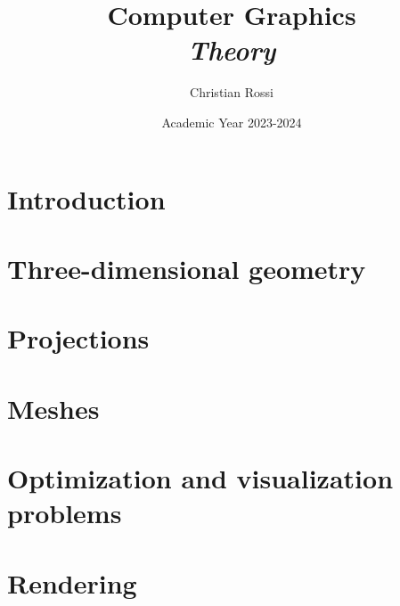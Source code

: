 \documentclass[12pt, a4paper]{report}
\title{Computer Graphics \\ \textit{Theory}}
\author{Christian Rossi}
\date{Academic Year 2023-2024}
\begin{document}
    \maketitle

    

    \cleardoublepage{}

    \tableofcontents

    \cleardoublepage{}

    \chapter{Introduction}
    
    
    

    \chapter{Three-dimensional geometry}
    
    
    
    

    \chapter{Projections}
    
    
    
    
    
    
    
    \chapter{Meshes}
    
    
    
    

    \chapter{Optimization and visualization problems}
    
    
    
    
    

    \chapter{Rendering}
    
    
    
    
    
    
    
    
    
\end{document}
